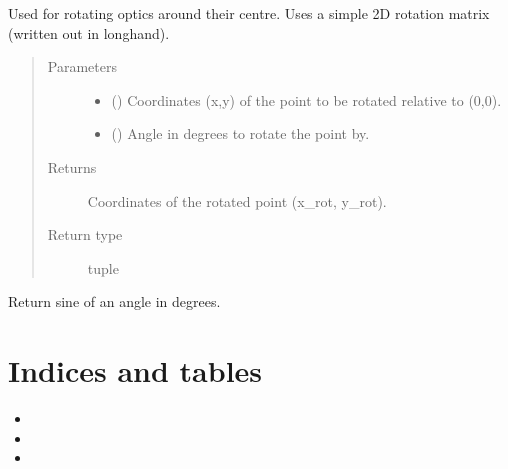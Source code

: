 \documentclass[letterpaper,10pt,english]{sphinxmanual}
\begin{document}
\begin{fulllineitems}
\begin{fulllineitems}
\sphinxAtStartPar
Used for rotating optics around their centre. Uses a simple 2D rotation
matrix (written out in longhand).
\begin{quote}\begin{description}
\item[{Parameters}] \leavevmode\begin{itemize}
\item {} 
\sphinxAtStartPar
{} () \textendash{} Coordinates (x,y) of the point to be rotated relative to (0,0).

\item {} 
\sphinxAtStartPar
{} () \textendash{} Angle in degrees to rotate the point by.

\end{itemize}

\item[{Returns}] \leavevmode
\sphinxAtStartPar
{} \textendash{} Coordinates of the rotated point (x\_rot, y\_rot).

\item[{Return type}] \leavevmode
\sphinxAtStartPar
tuple

\end{description}\end{quote}

\end{fulllineitems}


\begin{fulllineitems}
\label{\detokenize{index:pyopticaltable.Tools.sind}}
\sphinxAtStartPar
Return sine of an angle in degrees.

\end{fulllineitems}


\end{fulllineitems}



\chapter{Indices and tables}
\label{\detokenize{index:indices-and-tables}}\begin{itemize}
\item {} 
\sphinxAtStartPar
{}

\item {} 
\sphinxAtStartPar
{}

\item {} 
\sphinxAtStartPar
{}

\end{itemize}
\end{document}

